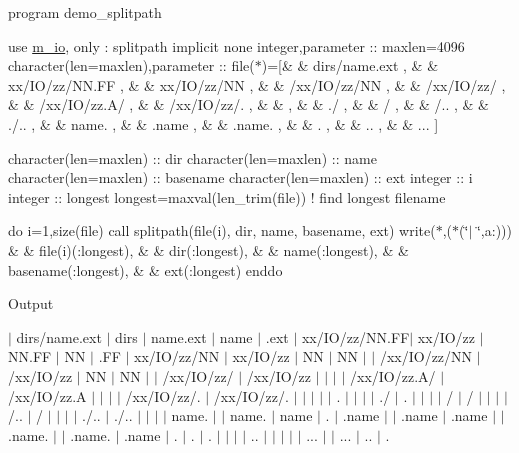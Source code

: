 program demo\+\_\+splitpath

use \hyperlink{namespacem__io}{m\+\_\+io}, only \+: splitpath implicit none integer,parameter \+:\+: maxlen=4096 character(len=maxlen),parameter \+:\+: file($\ast$)=\mbox{[}\& \& \textquotesingle{}dirs/name.\+ext \textquotesingle{}, \& \& \textquotesingle{}xx/\+I\+O/zz/\+N\+N.\+FF \textquotesingle{}, \& \& \textquotesingle{}xx/\+I\+O/zz/\+NN \textquotesingle{}, \& \& \textquotesingle{}/xx/\+I\+O/zz/\+NN \textquotesingle{}, \& \& \textquotesingle{}/xx/\+I\+O/zz/ \textquotesingle{}, \& \& \textquotesingle{}/xx/\+I\+O/zz.A/ \textquotesingle{}, \& \& \textquotesingle{}/xx/\+I\+O/zz/. \textquotesingle{}, \& \& \textquotesingle{} \textquotesingle{}, \& \& \textquotesingle{}./ \textquotesingle{}, \& \& \textquotesingle{}/ \textquotesingle{}, \& \& \textquotesingle{}/.. \textquotesingle{}, \& \& \textquotesingle{}./.. \textquotesingle{}, \& \& \textquotesingle{}name. \textquotesingle{}, \& \& \textquotesingle{}.name \textquotesingle{}, \& \& \textquotesingle{}.name. \textquotesingle{}, \& \& \textquotesingle{}. \textquotesingle{}, \& \& \textquotesingle{}.. \textquotesingle{}, \& \& \textquotesingle{}... \textquotesingle{}\mbox{]}

character(len=maxlen) \+:\+: dir character(len=maxlen) \+:\+: name character(len=maxlen) \+:\+: basename character(len=maxlen) \+:\+: ext integer \+:\+: i integer \+:\+: longest longest=maxval(len\+\_\+trim(file)) ! find longest filename

do i=1,size(file) call splitpath(file(i), dir, name, basename, ext) write($\ast$,\textquotesingle{}($\ast$(\char`\"{}$\vert$ \char`\"{},a\+:))\textquotesingle{}) \& \& file(i)(\+:longest), \& \& dir(\+:longest), \& \& name(\+:longest), \& \& basename(\+:longest), \& \& ext(\+:longest) enddo

Output

$\vert$ dirs/name.\+ext $\vert$ dirs $\vert$ name.\+ext $\vert$ name $\vert$ .ext $\vert$ xx/\+I\+O/zz/\+N\+N.\+FF$\vert$ xx/\+I\+O/zz $\vert$ N\+N.\+FF $\vert$ NN $\vert$ .FF $\vert$ xx/\+I\+O/zz/\+NN $\vert$ xx/\+I\+O/zz $\vert$ NN $\vert$ NN $\vert$ $\vert$ /xx/\+I\+O/zz/\+NN $\vert$ /xx/\+I\+O/zz $\vert$ NN $\vert$ NN $\vert$ $\vert$ /xx/\+I\+O/zz/ $\vert$ /xx/\+I\+O/zz $\vert$ $\vert$ $\vert$ $\vert$ /xx/\+I\+O/zz.A/ $\vert$ /xx/\+I\+O/zz.A $\vert$ $\vert$ $\vert$ $\vert$ /xx/\+I\+O/zz/. $\vert$ /xx/\+I\+O/zz/. $\vert$ $\vert$ $\vert$ $\vert$ $\vert$ . $\vert$ $\vert$ $\vert$ $\vert$ ./ $\vert$ . $\vert$ $\vert$ $\vert$ $\vert$ / $\vert$ / $\vert$ $\vert$ $\vert$ $\vert$ /.. $\vert$ / $\vert$ $\vert$ $\vert$ $\vert$ ./.. $\vert$ ./.. $\vert$ $\vert$ $\vert$ $\vert$ name. $\vert$ $\vert$ name. $\vert$ name $\vert$ . $\vert$ .name $\vert$ $\vert$ .name $\vert$ .name $\vert$ $\vert$ .name. $\vert$ $\vert$ .name. $\vert$ .name $\vert$ . $\vert$ . $\vert$ . $\vert$ $\vert$ $\vert$ $\vert$ .. $\vert$ $\vert$ $\vert$ $\vert$ $\vert$ ... $\vert$ $\vert$ ... $\vert$ .. $\vert$ . 

